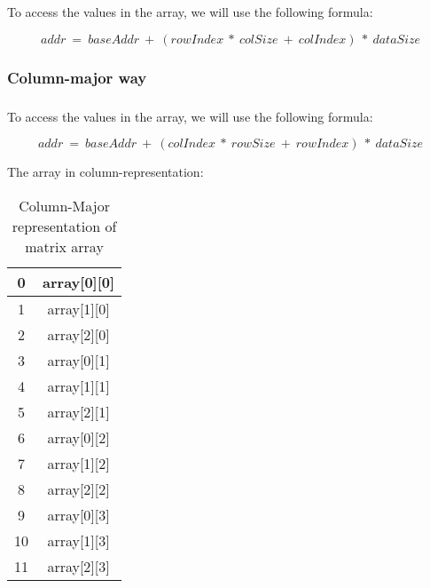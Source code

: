 \documentclass{article}
\begin{document}
To access the values in the array, we will use the following formula:

$$
addr\ =\ baseAddr\ +\ (rowIndex\ *\ colSize\ +\ colIndex)\ *\ dataSize
$$

\newpage
\subsubsection{Column-major way}

\subparagraph{}

To access the values in the array, we will use the following formula:

$$
addr\ =\ baseAddr\ +\ (colIndex\ *\ rowSize\ +\ rowIndex)\ *\ dataSize
$$

The array in column-representation:

\begin{table}[h]
\centering
\begin{tabular}{|c|c|}
\hline
0 & array[0][0] \\
\hline
1 & array[1][0] \\
\hline
2 & array[2][0] \\
\hline
3 & array[0][1] \\
\hline
4 & array[1][1] \\
\hline
5 & array[2][1] \\
\hline
6 & array[0][2] \\
\hline
7 & array[1][2] \\
\hline
8 & array[2][2] \\
\hline
9 & array[0][3] \\
\hline
10 & array[1][3] \\
\hline
11 & array[2][3] \\
\hline
\end{tabular}
\caption{Column-Major representation of matrix array}
\label{tab:mytable}
\end{table}
\end{document}
